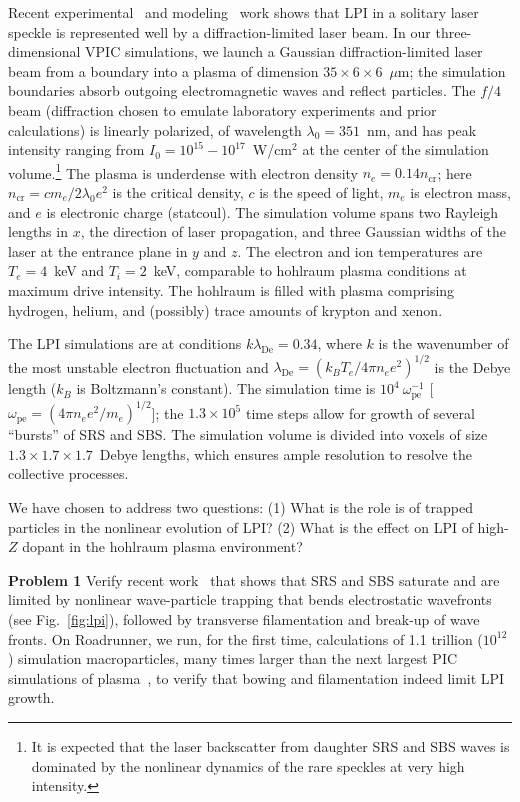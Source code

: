 \documentclass[10pt]{article}
\newcommand{\lde}      {\lambda_{\mathrm{De}}}
\newcommand{\wpe}      {\omega_{\mathrm{pe}}}
\begin{document}
Recent experimental~\cite{Kline_PRL_2005} and
modeling~\cite{Yin_et_al_PRL_2007_SRS} work shows that LPI in a
solitary laser speckle is represented well by a diffraction-limited
laser beam.  In our three-dimensional VPIC simulations, we launch a
Gaussian diffraction-limited laser beam from a boundary into a plasma
of dimension $35 \times 6 \times 6$~$\mu$m; the simulation boundaries
absorb outgoing electromagnetic waves and reflect particles.  The
$f/4$ beam (diffraction chosen to emulate laboratory experiments and
prior calculations) is linearly polarized, of wavelength
$\lambda_0 = 351$~nm, and has peak intensity ranging from $I_0 =
10^{15} - 10^{17}$~W/cm$^2$ at the center of the simulation volume.\footnote{It 
is expected that the laser backscatter from daughter SRS and SBS waves 
is dominated by the nonlinear dynamics of the rare speckles at very 
high intensity.}
The plasma is underdense with electron density $n_e = 0.14
n_{\mathrm{cr}}$; here $n_{\mathrm{cr}} = c m_e / 2 \lambda_0 e^2$ is
the critical density, $c$ is the speed of light, $m_e$ is electron
mass, and $e$ is electronic charge (statcoul).  The simulation volume 
spans two Rayleigh lengths in $x$, the direction
of laser propagation, and three Gaussian widths of the laser
at the entrance plane in $y$ and $z$.  The electron and ion
temperatures are $T_e = 4$~keV and $T_i = 2$~keV, comparable to hohlraum
plasma conditions at maximum drive intensity.  The
hohlraum is filled with plasma comprising hydrogen, helium, and
(possibly) trace amounts of krypton and xenon.

The LPI simulations are at conditions $k \lde = 0.34$, where $k$
is the wavenumber of the most unstable electron 
fluctuation and $\lde = (k_B T_e / 4 \pi n_e e^2)^{1/2}$ is the 
Debye length ($k_B$ is Boltzmann's constant).  The simulation time is
$10^4~\wpe^{-1}$ [$\wpe = (4 \pi n_e e^2 / m_e)^{1/2}$]; 
the $1.3 \times 10^5$ time steps allow for growth
of several ``bursts'' of SRS and SBS.  The simulation volume is
divided into voxels of size $1.3 \times 1.7 \times 1.7$~Debye
lengths, which ensures ample resolution to resolve the collective
processes.

We have chosen to address two questions: (1) What is
the role is of trapped particles in the nonlinear evolution of LPI?
(2) What is the effect on LPI of high-$Z$ dopant in the
hohlraum plasma environment?

\textbf{Problem 1}
Verify recent work~\cite{Yin_et_al_PRL_2007_SRS,Yin_et_al_Phys_Plasmas_2007_SRS}
that shows that SRS and SBS saturate and are limited by nonlinear 
wave-particle trapping that bends electrostatic wavefronts (see 
Fig.~\ref{fig:lpi}), followed by transverse filamentation and break-up 
of wave fronts.  On Roadrunner, we run, for the first 
time, calculations of 1.1 trillion ($10^{12}$) simulation macroparticles,
many times larger than the next largest PIC simulations of
plasma~\cite{Yin_et_al_PRL_2007_reconnection}, to verify that 
bowing and filamentation indeed limit LPI growth.
\end{document}
